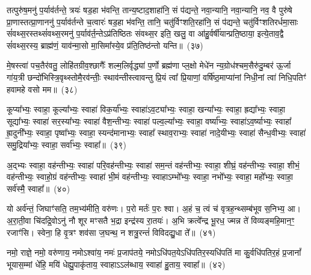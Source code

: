 तत्पुरु॑ष॒मनु॑ प॒र्याव॑र्तन्ते॒ त्रयः॑ षड॒हा भ॑वन्ति॒ तान्य॒ष्टाद॒शाहा॑नि॒ सं प॑द्यन्ते॒ नवा॒न्यानि॒ नवा॒न्यानि॒ नव॒ वै पुरु॑षे प्रा॒णास्तत्प्रा॒णाननु॑ प॒र्याव॑र्तन्ते च॒त्वारः॑ षड॒हा भ॑वन्ति॒ तानि॒ चतु॑र्विꣳशति॒रहा॑नि॒ सं प॑द्यन्ते॒ चतु॑र्विꣳशतिरर्धमा॒साः सं॑वथ्स॒रस्तथ्सं॑वथ्स॒रमनु॑ प॒र्याव॑र्त॒न्ते\-ऽप्र॑तिष्ठितः संवथ्स॒र इति॒ खलु॒ वा आ॑हु॒र्वर्\mbox{}षी॑यान्प्रति॒ष्ठाया॒ इत्ये॒ताव॒द्वै सं॑वथ्स॒रस्य॒ ब्राह्म॑णं॒ याव॑न्मा॒सो मा॒सिमा᳚स्ये॒व प्र॑ति॒तिष्ठ॑न्तो यन्ति॥~(३७)

{\anuvakamend[{वि॒राज॑मे॒तेन॑ द्वाद॒शावे॒ताव॒द्वा अ॒ष्टौ च॑}]}%

मे॒षस्त्वा॑ पच॒तैर॑वतु॒ लोहि॑तग्रीव॒श्छागैः᳚ शल्म॒लिर्वृद्ध्या॑ प॒र्णो ब्रह्म॑णा प्ल॒क्षो मेधे॑न न्य॒ग्रोध॑श्चम॒सैरु॑दु॒म्बर॑ ऊ॒र्जा गा॑य॒त्री छन्दो॑भिस्त्रि॒वृथ्स्तोमै॒रव॑न्तीः॒ स्थाव॑न्तीस्त्वावन्तु प्रि॒यं त्वा᳚ प्रि॒याणां॒ वर्\mbox{}षि॑ष्ठ॒माप्या॑नां निधी॒नां त्वा॑ निधि॒पतिꣳ॑ हवामहे वसो मम॥~(३८)

{\anuvakamend[{मे॒षः षट्त्रिꣳ॑शत्}]}%

कूप्या᳚भ्यः॒ स्वाहा॒ कूल्या᳚भ्यः॒ स्वाहा॑ विक॒र्या᳚भ्यः॒ स्वाहा॑\-ऽव॒ट्या᳚भ्यः॒ स्वाहा॒ खन्या᳚भ्यः॒ स्वाहा॒ ह्रद्या᳚भ्यः॒ स्वाहा॒ सूद्या᳚भ्यः॒ स्वाहा॑ सर॒स्या᳚भ्यः॒ स्वाहा॑ वैश॒न्तीभ्यः॒ स्वाहा॑ पल्व॒ल्या᳚भ्यः॒ स्वाहा॒ वर्ष्या᳚भ्यः॒ स्वाहा॑\-ऽव॒र्ष्याभ्यः॒ स्वाहा᳚ ह्रा॒दुनी᳚भ्यः॒ स्वाहा॒ पृष्वा᳚भ्यः॒ स्वाहा॒ स्यन्द॑मानाभ्यः॒ स्वाहा᳚ स्थाव॒राभ्यः॒ स्वाहा॑ नादे॒यीभ्यः॒ स्वाहा॑ सैन्ध॒वीभ्यः॒ स्वाहा॑ समु॒द्रिया᳚भ्यः॒ स्वाहा॒ सर्वा᳚भ्यः॒ स्वाहा᳚॥~(३९)

{\anuvakamend[{कूप्या᳚भ्यश्चत्वारि॒ꣳ॒शत्}]}%

अ॒द्भ्यः स्वाहा॒ वह॑न्तीभ्यः॒ स्वाहा॑ परि॒वह॑न्तीभ्यः॒ स्वाहा॑ सम॒न्तं वह॑न्तीभ्यः॒ स्वाहा॒ शीघ्रं॒ वह॑न्तीभ्यः॒ स्वाहा॒ शीभं॒ वह॑न्तीभ्यः॒ स्वाहो॒ग्रं वह॑न्तीभ्यः॒ स्वाहा॑ भी॒मं वह॑न्तीभ्यः॒ स्वाहा\-ऽम्भो᳚भ्यः॒ स्वाहा॒ नभो᳚भ्यः॒ स्वाहा॒ महो᳚भ्यः॒ स्वाहा॒ सर्व॑स्मै॒ स्वाहा᳚॥~(४०)

{\anuvakamend[{अ॒द्भ्य एका॒न्नत्रि॒ꣳ॒शत्}]}%

यो अर्व॑न्तं॒ जिघाꣳ॑सति॒ तम॒भ्य॑मीति॒ वरु॑णः। प॒रो मर्तः॑ प॒रः श्वा। अ॒हं च॒ त्वं च॑ वृत्रह॒न्थ्सम्ब॑भूव स॒निभ्य॒ आ। अ॒रा॒ती॒वा चि॑दद्रि॒वो\-ऽनु॑ नौ शूर मꣳसतै भ॒द्रा इन्द्र॑स्य रा॒तयः॑। अ॒भि क्रत्वे᳚न्द्र भू॒रध॒ ज्मन्न ते॑ विव्यङ्महि॒मान॒ꣳ॒ रजाꣳ॑सि। स्वेना॒ हि वृ॒त्रꣳ शव॑सा ज॒घन्थ॒ न शत्रु॒रन्तं॑ विविदद्यु॒धा ते᳚॥~(४१)

{\anuvakamend[{वि॒वि॒दद्द्वे च॑}]}%

नमो॒ राज्ञे॒ नमो॒ वरु॑णाय॒ नमो\-ऽश्वा॑य॒ नमः॑ प्र॒जा\-प॑तये॒ नमो\-ऽधि॑पत॒ये\-ऽधि॑\-पतिर॒स्यधि॑\-पतिं मा कु॒र्वधि॑\-पतिर॒हं प्र॒जानां᳚ भूयास॒म्मां धे॑हि॒ मयि॑ धेह्यु॒पाकृ॑ताय॒ स्वाहा\-ऽऽ\-ल॑ब्धाय॒ स्वाहा॑ हु॒ताय॒ स्वाहा᳚॥~(४२)

